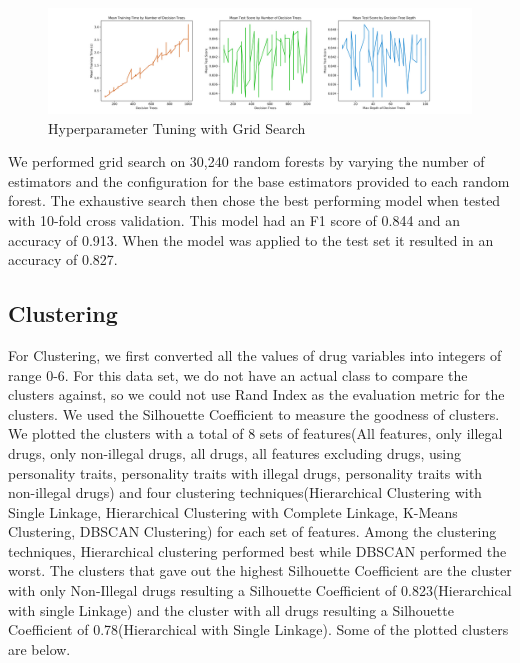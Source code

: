 \documentclass[10pt]{article}
\begin{document}
\begin{figure}[H]
\caption{Hyperparameter Tuning with Grid Search }
\label{fig:gridsearch}
\centering
\includegraphics[scale=0.35]{gridsearch.png}
\end{figure}

We performed grid search on 30,240 random forests by varying the number of estimators and the configuration for the base estimators provided to each random forest. The exhaustive search then chose the best performing model when tested with 10-fold cross validation. This model had an F1 score of 0.844 and an accuracy of 0.913. When the model was applied to the test set it resulted in an accuracy of 0.827.

\subsection*{Clustering}

	For Clustering, we first converted all the values of drug variables into integers of range 0-6. For this data set, we do not have an actual class to compare the clusters against, so we could not use Rand Index as the evaluation metric for the clusters. We used the Silhouette Coefficient to measure the goodness of clusters. 
	We plotted the clusters with a total of 8 sets of features(All features, only illegal drugs, only non-illegal drugs, all drugs, all features excluding drugs, using personality traits,  personality traits with illegal drugs, personality traits with non-illegal drugs) and four clustering techniques(Hierarchical Clustering with Single Linkage, Hierarchical Clustering with Complete Linkage, K-Means Clustering, DBSCAN Clustering) for each set of features.
    Among the clustering techniques, Hierarchical clustering performed best while DBSCAN performed the worst. The clusters that gave out the highest Silhouette Coefficient are the cluster with only Non-Illegal drugs resulting a Silhouette Coefficient of 0.823(Hierarchical with single Linkage) and the cluster with all drugs resulting a Silhouette Coefficient of 0.78(Hierarchical with Single Linkage). Some of the plotted clusters are below.
\end{document}
